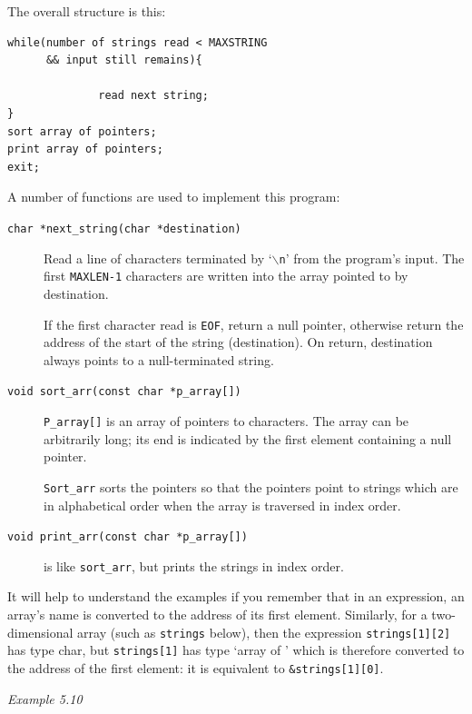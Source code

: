   The overall structure is this:


  \begin{Verbatim}
while(number of strings read < MAXSTRING
      && input still remains){

              read next string;
}
sort array of pointers;
print array of pointers;
exit;
\end{Verbatim}

  A number of functions are used to implement this program:


  \begin{description}
   \item[\texttt{char *next\_string(char *destination)}] 
    Read a line of characters terminated by `\texttt{$\backslash$n}' from
     the program's input. The first \texttt{MAXLEN-1} characters are
     written into the array pointed to by destination.

    If the first character read is \texttt{EOF}, return a null pointer,
     otherwise return the address of the start of the string (destination).
     On return, destination always points to a null-terminated string.

   

   \item[\texttt{void sort\_arr(const char *p\_array[])}] 
    \texttt{P\_array[]} is an array of pointers to characters. The
     array can be arbitrarily long; its end is indicated by the first element
     containing a null pointer.

    \texttt{Sort\_arr} sorts the pointers so that the pointers point to
     strings which are in alphabetical order when the array is traversed in
     index order.

   

   \item[\texttt{\small void print\_arr(const char *p\_array[])}]
     is like \texttt{sort\_arr}, but prints the strings in index order.
  \end{description}

  It will help to understand the examples if you remember that in an
   expression, an array's name is converted to the address of its first
   element. Similarly, for a two-dimensional array (such as
   \texttt{strings} below), then the expression
   \texttt{strings[1][2]} has type char, but \texttt{strings[1]} has
   type `array of \kchar' which is therefore converted to
   the address of the first element: it is equivalent to
   \texttt{\&strings[1][0]}.


   \begin{center}\textit{Example 5.10}\end{center}


